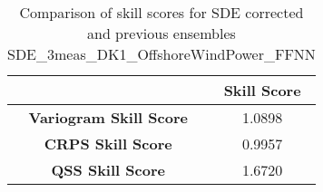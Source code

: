 
\begin{table}[h!]
    \centering
    \begin{tabular}{|c|c|}
        \hline
        & \textbf{Skill Score}  \\
        \hline
        \textbf{Variogram Skill Score} & 1.0898  \\
        \hline
        \textbf{CRPS Skill Score} & 0.9957  \\
        \hline
        \textbf{QSS Skill Score} & 1.6720 \\
        \hline
    \end{tabular}
    \caption{Comparison of skill scores for SDE corrected and previous ensembles SDE_3meas_DK1_OffshoreWindPower_FFNN}
    \label{table:skill_scores_comparison}
\end{table}
        